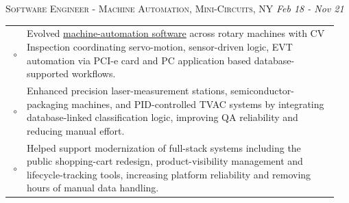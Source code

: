 \documentclass[a4paper]{article}
\newcommand{\SpaceBetweenJobs}{\vspace{-1em}}
\begin{document}
\noindent
\colorbox{gray!15}{
    \parbox[c][0.6em][c]{\linewidth}{
        \faBriefcase\;\textsc{Software Engineer - Machine Automation, Mini-Circuits, NY}
        \hfill \emph{Feb 18 - Nov 21}
    }
}
{\color{previousWork}
\begin{tabular}{r p{0.95\linewidth}}
$\circ$	&	{\fontspec{Inter}	Evolved \underline{machine-automation software} across rotary machines with CV Inspection coordinating servo-motion, sensor-driven logic, EVT automation via PCI-e card and PC application based database-supported workflows.	}	\\
$\circ$	&	{\fontspec{Inter}	Enhanced precision laser-measurement stations, semiconductor-packaging machines, and PID-controlled TVAC systems by integrating database-linked classification logic, improving QA reliability and reducing manual effort.	}	\\
$\circ$	&	{\fontspec{Inter}	Helped support modernization of full-stack systems including the public shopping-cart redesign, product-visibility management and lifecycle-tracking tools, increasing platform reliability and removing hours of manual data handling.	}	\\
\end{tabular}
}

\SpaceBetweenJobs
\end{document}
